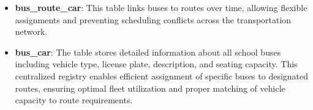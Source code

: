 \begin{itemize}[itemsep=-0.1cm]
    \item \textbf{bus\_route\_car}: This table links buses to routes over time, allowing flexible assignments and preventing scheduling conflicts across the transportation network.
    \item \textbf{bus\_car}: The table stores detailed information about all school buses including vehicle type, license plate, description, and seating capacity. This centralized registry enables efficient assignment of specific buses to designated routes, ensuring optimal fleet utilization and proper matching of vehicle capacity to route requirements.
\end{itemize}